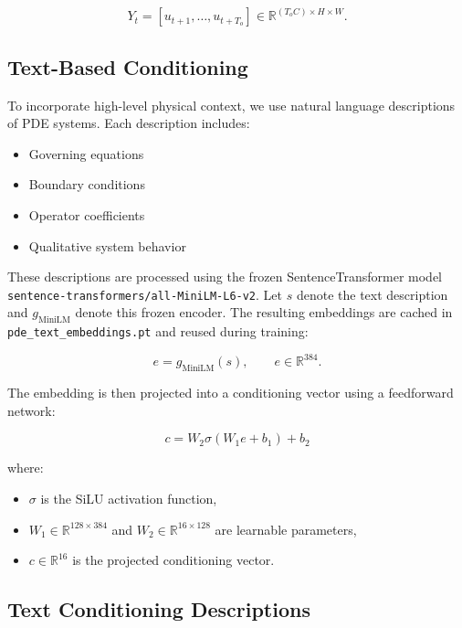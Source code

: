\documentclass[
]{article}
\providecommand{\tightlist}{%
  \setlength{\itemsep}{0pt}\setlength{\parskip}{0pt}}
\begin{document}
\begin{equation}
Y_t = [u_{t+1}, \ldots, u_{t+T_o}] \in \mathbb{R}^{(T_o C) \times H \times W}.
\end{equation}

\subsection{Text-Based Conditioning}\label{text-based-conditioning}

To incorporate high-level physical context, we use natural language
descriptions of PDE systems. Each description includes:

\begin{itemize}
\tightlist
\item
  Governing equations
\item
  Boundary conditions
\item
  Operator coefficients
\item
  Qualitative system behavior
\end{itemize}

These descriptions are processed using the frozen SentenceTransformer
model \texttt{sentence-transformers/all-MiniLM-L6-v2}. Let \(s\) denote
the text description and \(g_{\mathrm{MiniLM}}\) denote this frozen
encoder. The resulting embeddings are cached in
\texttt{pde\_text\_embeddings.pt} and reused during training:

\begin{equation}
e = g_{\mathrm{MiniLM}}(s), \qquad e \in \mathbb{R}^{384}.
\end{equation}

The embedding is then projected into a conditioning vector using a
feedforward network:

\begin{equation}
 c = W_2 \sigma(W_1 e + b_1) + b_2
\end{equation}

where:

\begin{itemize}
\tightlist
\item
  \(\sigma\) is the SiLU activation function,
\item
  \(W_1 \in \mathbb{R}^{128 \times 384}\) and
  \(W_2 \in \mathbb{R}^{16 \times 128}\) are learnable parameters,
\item
  \(c \in \mathbb{R}^{16}\) is the projected conditioning vector.
\end{itemize}

\subsection{Text Conditioning
Descriptions}\label{text-conditioning-descriptions}
\end{document}
